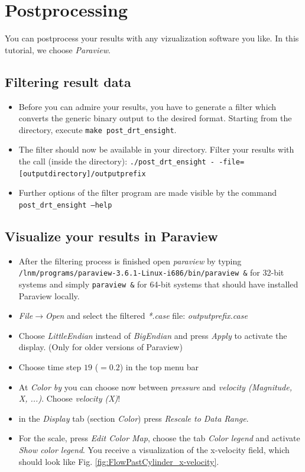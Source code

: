 \section{Postprocessing}

You can postprocess your results with any vizualization software you like. In this tutorial, we choose \emph{Paraview}. 

\subsection{Filtering result data}
\begin{itemize}
\item Before you can admire your results, you have to generate a filter 
which converts the generic binary \baci{} output to the desired format.
Starting from the \baci{} directory, execute \texttt{make post\_drt\_ensight}.
\item The filter should now be available in your \baci{} directory. Filter your results with
the call (inside the \baci{} directory): \texttt{./post\_drt\_ensight -\,-file=[outputdirectory]/outputprefix} 
\item Further options of the filter program are made visible by the command \texttt{post\_drt\_ensight --help}
\end{itemize}

\subsection{Visualize your results in Paraview}
\begin{itemize}
\item After the filtering process is finished open \emph{paraview} by typing \newline
\texttt{/lnm/programs/paraview-3.6.1-Linux-i686/bin/paraview \&} for 32-bit systems and simply \newline
\texttt{paraview \&} for 64-bit systems that should have installed Paraview locally.
\item \emph{File$\to$Open} and select the filtered \emph{*.case}
file: \emph{outputprefix.case}
\item Choose \emph{LittleEndian} instead of \emph{BigEndian} and press \emph{Apply} to activate the display. \newline (Only for older versions of Paraview)
\item Choose time step $19$ ($=0.2$) in the top menu bar 
\item At \emph{Color by} you can choose now between \emph{pressure} and \emph{velocity (Magnitude, X, ...)}. Choose \emph{velocity (X)}!
\item in the \emph{Display} tab (section \emph{Color}) press \emph{Rescale to Data Range}. 
\item For the scale, press \emph{Edit Color Map}, choose the tab \emph{Color legend} and activate \emph{Show color legend}.
You receive a visualization of the x-velocity field, which should look like Fig. \ref{fig:FlowPastCylinder_x-velocity}.
\end{itemize}

